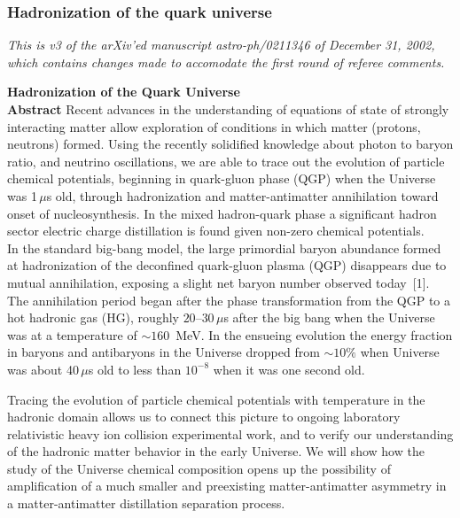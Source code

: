 \subsubsection{Hadronization of the quark universe}
\noindent\textit{This is v3 of the arXiv\rq ed manuscript  astro-ph/0211346 of December 31, 2002, which contains changes made to accomodate the first round of  referee comments.}\\[-0.7cm]
%
% 
\begin{mdframed}[linecolor=gray,roundcorner=12pt,backgroundcolor=Dandelion!15,linewidth=1pt,leftmargin=0cm,rightmargin=0cm,topline=true,bottomline=true,skipabove=12pt]\relax%
\textbf{\Large Hadronization of the Quark Universe}\\[0.2cm]
\textbf{Abstract}
{\small Recent advances in the understanding of equations of state of strongly interacting matter allow exploration of conditions in which matter (protons, neutrons) formed. Using the recently solidified knowledge about photon to baryon ratio, and neutrino oscillations, we are able to trace out the evolution of particle chemical potentials, beginning in quark-gluon phase (QGP) when the Universe was 1\,$\mu$s old, through hadronization and matter-antimatter annihilation toward onset of nucleosynthesis.  In  the mixed hadron-quark phase a significant hadron sector  electric  charge distillation is found given non-zero chemical potentials.}\\


In the standard big-bang model, the large primordial baryon abundance formed at hadronization of the deconfined quark-gluon plasma (QGP) disappears due to mutual annihilation, exposing a slight net baryon number observed today~[1]. The annihilation period began after the phase transformation from the QGP to a hot hadronic gas (HG), roughly $20$--$30\,\mu$s after the big bang when the Universe was at a temperature of $\sim 160$~MeV. In the ensueing evolution the energy fraction in baryons and antibaryons in the  Universe dropped from $\sim 10\%$ when Universe was about 40\,$\mu$s old to less than $10^{-8}$ when it was one second old. 

Tracing the evolution  of particle chemical potentials with temperature in the hadronic domain allows us to connect this picture to ongoing laboratory relativistic heavy ion collision experimental work, and to verify our understanding of the hadronic matter behavior in the early Universe. We will show how the study of the Universe chemical composition opens up the possibility of amplification of a much smaller and preexisting matter-antimatter asymmetry in a  matter-antimatter distillation separation process. 


\end{mdframed}
